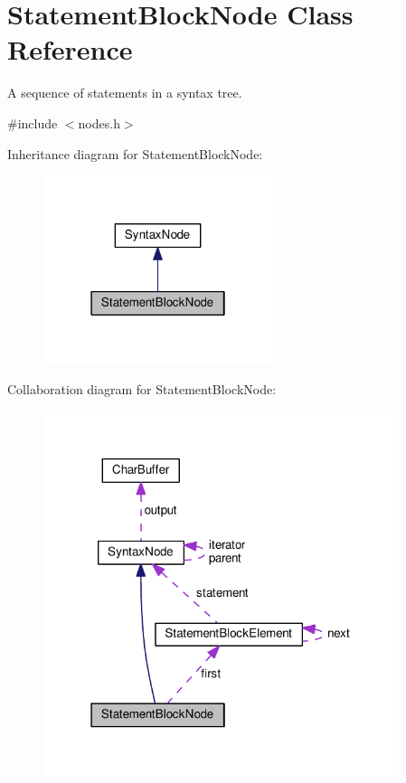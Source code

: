 \hypertarget{classStatementBlockNode}{}\section{Statement\+Block\+Node Class Reference}
\label{classStatementBlockNode}


A sequence of statements in a syntax tree.  




{\ttfamily \#include $<$nodes.\+h$>$}



Inheritance diagram for Statement\+Block\+Node\+:
\nopagebreak
\begin{figure}[H]
\begin{center}
\leavevmode
\includegraphics[width=190pt]{d8/d7c/classStatementBlockNode__inherit__graph}
\end{center}
\end{figure}


Collaboration diagram for Statement\+Block\+Node\+:
\nopagebreak
\begin{figure}[H]
\begin{center}
\leavevmode
\includegraphics[width=295pt]{dc/d25/classStatementBlockNode__coll__graph}
\end{center}
\end{figure}
